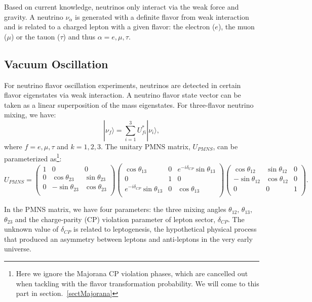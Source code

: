 Based on current knowledge, neutrinos only interact via the weak force and gravity. A neutrino $\nu_\alpha$ is generated with a definite flavor from weak interaction and is related to a charged lepton with a given flavor: the electron ($e$), the muon ($\mu$) or the tauon ($\tau$) and thus $\alpha=e,\mu,\tau$.

\subsection{Vacuum Oscillation}\label{sectVacuumOsci}
For neutrino flavor oscillation experiments, neutrinos are detected in certain flavor eigenstates via weak interaction. A neutrino flavor state vector can be taken as a linear superposition of the mass eigenstates. For three-flavor neutrino mixing, we have\cite{pdg2018}:
\begin{equation}\label{eq:mixingmatrix}
|\nu_f\rangle = \sum_{i=1}^3U^*_{fi}|\nu_i\rangle, 
\end{equation}
where $f=e,\mu,\tau$ and $k=1,2,3$. The unitary PMNS matrix, $U_{PMNS}$, can be parameterized as\footnote{Here we ignore the Majorana CP violation phases, which are cancelled out when tackling with the flavor transformation probability. We will come to this part in section.~\ref{sectMajorana}}: 
\begin{equation}\label{eq:uPMNS}
U_{PMNS} =
\begin{pmatrix}
1 &0 &0\\
0 &\cos\theta_{23} &\sin\theta_{23}\\
0 &-\sin\theta_{23} &\cos\theta_{23}\\ 
\end{pmatrix}
\begin{pmatrix}
\cos\theta_{13} &0 &e^{-i\delta_{CP}}\sin\theta_{13}\\
0 &1 &0\\
e^{-i\delta_{CP}}\sin\theta_{13} &0 &\cos\theta_{13}\\ 
\end{pmatrix}
\begin{pmatrix}
\cos\theta_{12} &\sin\theta_{12} &0\\
-\sin\theta_{12} &\cos\theta_{12} &0\\
0 &0 &1\\ 
\end{pmatrix}.
\end{equation}

In the PMNS matrix, we have four parameters: the three mixing angles $\theta_{12}$, $\theta_{13}$, $\theta_{23}$ and the charge-parity (CP) violation parameter of lepton sector, $\delta_{CP}$. The unknown value of $\delta_{CP}$ is related to leptogenesis, the hypothetical physical process that produced an asymmetry between leptons and anti-leptons in the very early universe\cite{wiki_cp}. 

